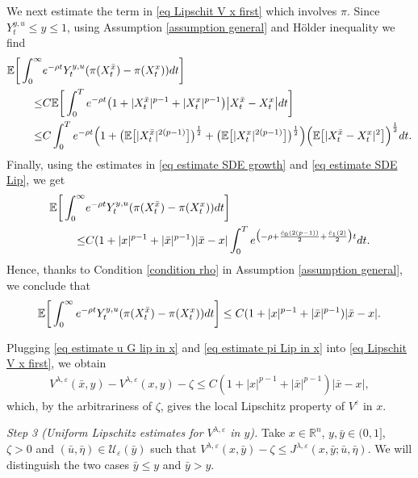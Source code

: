 \documentclass[11pt]{amsart}
\theoremstyle{plain}
\def \dd{{\rm d}}
\numberwithin{equation}{section}
\begin{document}
We next estimate the term in \eqref{eq Lipschit V x first}  which involves $\pi$. 
Since $Y^{y,u}_t \leq y \leq 1$,  using Assumption \ref{assumption general} and Hölder inequality  we find
$$
\begin{aligned}
 \mathbb E  \bigg[\int_0^\infty & e ^{-\rho t}  Y^{y,u}_t( \pi (X_t^{\bar x}) - \pi (X_t^x))  \dd t \bigg] \\
 \leq &  C \mathbb{E} \bigg[ \int_0^T e^{-\rho t} 
\big(1+ |  X ^{\bar x}_t |^{p-1} + | X_t^{x}  |^{p-1} \big) \big|  X ^{\bar x}_t- X^{x }_t \big| \dd t \bigg] \\
 \leq &    C   \int_0^T e ^{-\rho t} \Big( 1 + \big( \mathbb E \big[ | X ^{\bar x }_t|^{2(p-1)} \big] \big)^{\frac12} + \big( \mathbb E \big[ | X ^{x }_t|^{2(p-1)} \big] \big)^{\frac12}  \Big) \Big( \mathbb E  \big[ |  X ^{\bar x}_t -  X ^{x}_t |^2 \big]  \Big)^{\frac12}  \dd t.
\end{aligned}
$$
Finally, using the estimates in \eqref{eq estimate SDE growth} and \eqref{eq estimate SDE Lip}, we get
$$
\begin{aligned}
\mathbb E  \bigg[\int_0^\infty & e ^{-\rho t}  Y^{y,u}_t( \pi (X_t^{\bar x}) - \pi (X_t^x))  \dd t \bigg] \\
 \leq &   C (1 + |x|^{p-1} + |\bar x|^{p-1}) |\bar x - x| 
 \int_0^T e ^{ \big(-\rho  + \frac{\hat c _0 ( 2(p-1))}{2} + \frac{\hat c _1 (2)}{2} \big) t } \dd t.
\end{aligned}
$$
Hence, thanks to Condition \ref{condition rho} in Assumption \ref{assumption general}, we conclude that
\begin{equation}
    \label{eq estimate pi Lip in x}
    \mathbb E  \bigg[\int_0^\infty e ^{-\rho t}  Y^{y,u}_t( \pi (X_t^{\bar x}) - \pi (X_t^x))  \dd t \bigg] \leq C  (1 + |x|^{p-1} + |\bar x|^{p-1})  |\bar x - x|. 
\end{equation}

Plugging \eqref{eq estimate u G lip in x} and \eqref{eq estimate pi Lip in x} into \eqref{eq Lipschit V x first}, we obtain
$$
\begin{aligned}
V^{\lambda, \varepsilon}(\bar x, y) - V^{\lambda, \varepsilon}(x,y) - \zeta  
\leq  C  (1 + |x|^{p-1} + |\bar x|^{p-1})  |\bar x - x|,
\end{aligned}
$$
which, by the arbitrariness of $\zeta$,  gives the local Lipschitz property of $V^\varepsilon$ in $x$.

\smallbreak\noindent
\emph{Step 3 (Uniform Lipschitz estimates for $V^{\lambda, \varepsilon}$ in $y$).}
Take $x \in \mathbb R^n$, $y, \bar y \in (0,1]$, $\zeta >0$ and  $(\bar u,\bar \eta) \in \mathcal U _\varepsilon (\bar y)$ such that $V^{\lambda, \varepsilon}( x, \bar y)  - \zeta 
\leq J^{\lambda, \varepsilon}( x, \bar y;\bar u, \bar \eta )$.
We will distinguish the two cases $\bar y \leq y$ and $\bar y >y$.
\end{document}
